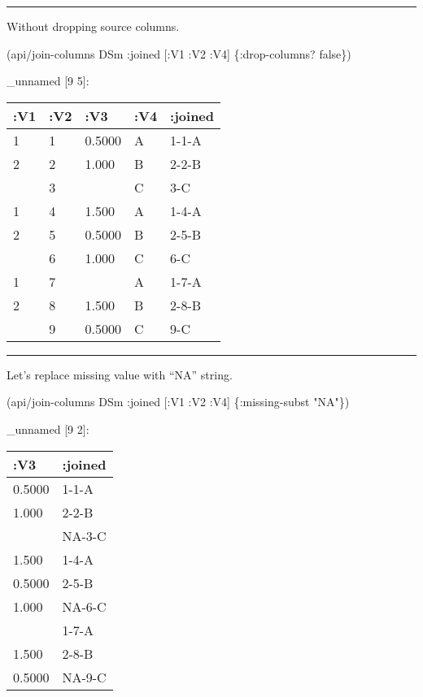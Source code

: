 \documentclass[]{article}
\newenvironment{Shaded}{\begin{snugshade}}{\end{snugshade}}
\newcommand{\StringTok}[1]{\textcolor[rgb]{0.31,0.60,0.02}{#1}}
\newcommand{\VariableTok}[1]{\textcolor[rgb]{0.00,0.00,0.00}{#1}}
\newcommand{\AttributeTok}[1]{\textcolor[rgb]{0.77,0.63,0.00}{#1}}
\newcommand{\NormalTok}[1]{#1}
\begin{document}
\begin{center}\rule{0.5\linewidth}{0.5pt}\end{center}

Without dropping source columns.

\begin{Shaded}
\begin{Highlighting}[]
\NormalTok{(api/join-columns DSm }\AttributeTok{:joined}\NormalTok{ [}\AttributeTok{:V1} \AttributeTok{:V2} \AttributeTok{:V4}\NormalTok{] \{}\AttributeTok{:drop-columns}\NormalTok{? }\VariableTok{false}\NormalTok{\})}
\end{Highlighting}
\end{Shaded}

\_unnamed {[}9 5{]}:

\begin{longtable}[]{@{}lllll@{}}
\toprule
:V1 & :V2 & :V3 & :V4 & :joined\tabularnewline
\midrule
\endhead
1 & 1 & 0.5000 & A & 1-1-A\tabularnewline
2 & 2 & 1.000 & B & 2-2-B\tabularnewline
& 3 & & C & 3-C\tabularnewline
1 & 4 & 1.500 & A & 1-4-A\tabularnewline
2 & 5 & 0.5000 & B & 2-5-B\tabularnewline
& 6 & 1.000 & C & 6-C\tabularnewline
1 & 7 & & A & 1-7-A\tabularnewline
2 & 8 & 1.500 & B & 2-8-B\tabularnewline
& 9 & 0.5000 & C & 9-C\tabularnewline
\bottomrule
\end{longtable}

\begin{center}\rule{0.5\linewidth}{0.5pt}\end{center}

Let's replace missing value with ``NA'' string.

\begin{Shaded}
\begin{Highlighting}[]
\NormalTok{(api/join-columns DSm }\AttributeTok{:joined}\NormalTok{ [}\AttributeTok{:V1} \AttributeTok{:V2} \AttributeTok{:V4}\NormalTok{] \{}\AttributeTok{:missing-subst} \StringTok{"NA"}\NormalTok{\})}
\end{Highlighting}
\end{Shaded}

\_unnamed {[}9 2{]}:

\begin{longtable}[]{@{}ll@{}}
\toprule
:V3 & :joined\tabularnewline
\midrule
\endhead
0.5000 & 1-1-A\tabularnewline
1.000 & 2-2-B\tabularnewline
& NA-3-C\tabularnewline
1.500 & 1-4-A\tabularnewline
0.5000 & 2-5-B\tabularnewline
1.000 & NA-6-C\tabularnewline
& 1-7-A\tabularnewline
1.500 & 2-8-B\tabularnewline
0.5000 & NA-9-C\tabularnewline
\bottomrule
\end{longtable}
\end{document}
